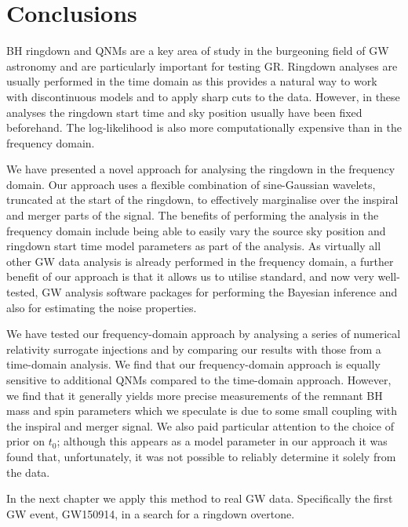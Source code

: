 \section{Conclusions}\label{ch3:sec:discussion}

BH ringdown and QNMs are a key area of study in the burgeoning field of GW astronomy and are particularly important for testing GR.
Ringdown analyses are usually performed in the time domain as this provides a natural way to work with discontinuous models and to apply sharp cuts to the data. 
However, in these analyses the ringdown start time and sky position usually have been fixed beforehand.
The log-likelihood is also more computationally expensive than in the frequency domain.

We have presented a novel approach for analysing the ringdown in the frequency domain. 
Our approach uses a flexible combination of sine-Gaussian wavelets, truncated at the start of the ringdown, to effectively marginalise over the inspiral and merger parts of the signal. 
The benefits of performing the analysis in the frequency domain include being able to easily vary the source sky position and ringdown start time model parameters as part of the analysis.
As virtually all other GW data analysis is already performed in the frequency domain, a further benefit of our approach is that it allows us to utilise standard, and now very well-tested, GW analysis software packages for performing the Bayesian inference and also for estimating the noise properties.

We have tested our frequency-domain approach by analysing a series of numerical relativity surrogate injections and by comparing our results with those from a time-domain analysis. 
We find that our frequency-domain approach is equally sensitive to additional QNMs compared to the time-domain approach.
However, we find that it generally yields more precise measurements of the remnant BH mass and spin parameters which we speculate is due to some small coupling with the inspiral and merger signal.
We also paid particular attention to the choice of prior on $t_0$; although this appears as a model parameter in our approach it was found that, unfortunately, it was not possible to reliably determine it solely from the data.

In the next chapter we apply this method to real GW data.
Specifically the first GW event, GW150914, in a search for a ringdown overtone.